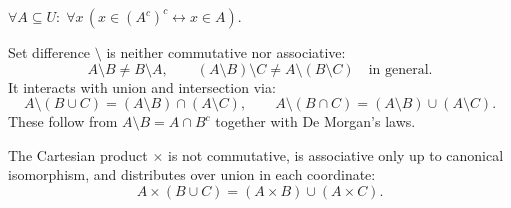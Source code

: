 \NoLocalDependencies

\begin{remark*}
$\forall A \subseteq U:\; \forall x\,(x \in (A^c)^c \leftrightarrow x \in A)$.
\end{remark*}

\begin{remark*}
Set difference $\setminus$ is neither commutative nor associative:
\[
A \setminus B \neq B \setminus A,
\qquad
(A \setminus B) \setminus C \neq A \setminus (B \setminus C) \quad \text{in general}.
\]
It interacts with union and intersection via:
\[
A \setminus (B \cup C) = (A \setminus B) \cap (A \setminus C),
\qquad
A \setminus (B \cap C) = (A \setminus B) \cup (A \setminus C).
\]
These follow from $A \setminus B = A \cap B^c$ together with De Morgan's laws.
\end{remark*}

\begin{remark*}
The Cartesian product $\times$ is not commutative, is associative only up to
canonical isomorphism, and distributes over union in each coordinate:
\[
A \times (B \cup C) = (A \times B) \cup (A \times C).
\]
\end{remark*}
